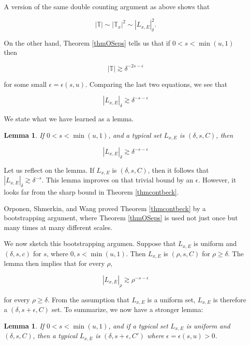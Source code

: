 \documentclass[12pt]{amsart}
\newtheorem{lemma}[theorem]{Lemma}
\newcommand{\TT}{\mathbb{T}}
\begin{document}
A version of the same double counting argument as above shows that

    $$ |\TT| \sim |\TT_x|^2 \sim  |L_{x,E}|_\delta^2. $$ 
    
 On the other hand,  Theorem \ref{thmOSeps} tells us that if $0 < s < \min(u,1)$ then 

    $$ |\TT| \gtrsim \delta^{-2s-\epsilon}$$ 

    for some small $\epsilon = \epsilon(s,u)$.   Comparing the last two equations,  we see that

    $$ |L_{x,E}|_\delta \gtrsim \delta^{-s-\epsilon}$$ 

We state what we have learned as a lemma.

    \begin{lemma} \label{lemepscontbeck}
        If $0<s< \min(u,1)$, and a typical set $L_{x,E}$ is $(\delta, s, C)$,  then 

        $$ |L_{x,E} |_\delta \gtrsim \delta^{-s-\epsilon}$$ 
    \end{lemma}

Let us reflect on the lemma.   If $L_{x,E}$ is $(\delta, s, C)$, then it follows that $|L_{x,E}|_\delta \gtrsim \delta^{-s}$.   This lemma improves on that trivial bound by an $\epsilon$.   However,  it looks far from the sharp bound in Theorem \ref{thmcontbeck}.

Orponen, Shmerkin, and Wang proved Theorem \ref{thmcontbeck} by a bootstrapping argument,  where Theorem \ref{thmOSeps} is used not just once but many times at many different scales.  

    We now sketch this bootstrapping argumen. Suppose that $L_{x,E}$ is uniform and $(\delta, s, c)$ for $s$, where $0 , s < \min(u,1)$. Then $L_{x,E}$ is $(\rho, s,C)$ for $\rho \geq \delta$. The lemma then implies that for every $\rho$,  

    $$ |L_{x,E} |_\rho \gtrsim \rho^{-s-\epsilon}$$ 

    for every $\rho \geq \delta$.   From the assumption that $L_{x,E}$ is a uniform set, $L_{x,E}$ is therefore a $(\delta, s + \epsilon, C)$ set.    To summarize,  we now have a stronger lemma:
    
        \begin{lemma} \label{lembootstrap}
        If $0<s< \min(u,1)$, and if a typical set $L_{x,E}$ is uniform and $(\delta, s, C)$,  then a typical $L_{x,E}$ is $(\delta,  s+\epsilon,  C')$ where $\epsilon = \epsilon(s,u) > 0$.  
    \end{lemma}
    
\end{document}
